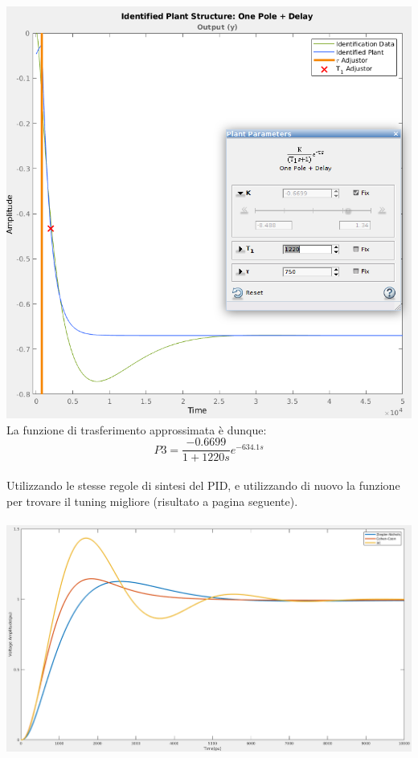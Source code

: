\documentclass[Lau,noexaminfo]{sapthesis}
\begin{document}
	\includegraphics[scale=2]{P3_estimating}\vfill
	La funzione di trasferimento approssimata è dunque:\\
	\begin{equation*}
	P3=\frac{-0.6699}{1+1220s}e^{-634.1s}
	\end{equation*}\\
	Utilizzando le stesse regole di sintesi del PID, e utilizzando di nuovo la funzione per trovare il tuning migliore (risultato a pagina seguente).\\\\
	\includegraphics[scale=0.32,angle=90]{tuning_migliore_P3}\\\\
\end{document}
